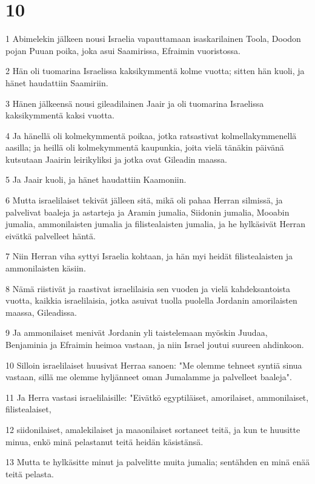 \chapter{10}

\par 1 Abimelekin jälkeen nousi Israelia vapauttamaan isaskarilainen Toola, Doodon pojan Puuan poika, joka asui Saamirissa, Efraimin vuoristossa.
\par 2 Hän oli tuomarina Israelissa kaksikymmentä kolme vuotta; sitten hän kuoli, ja hänet haudattiin Saamiriin.
\par 3 Hänen jälkeensä nousi gileadilainen Jaair ja oli tuomarina Israelissa kaksikymmentä kaksi vuotta.
\par 4 Ja hänellä oli kolmekymmentä poikaa, jotka ratsastivat kolmellakymmenellä aasilla; ja heillä oli kolmekymmentä kaupunkia, joita vielä tänäkin päivänä kutsutaan Jaairin leirikyliksi ja jotka ovat Gileadin maassa.
\par 5 Ja Jaair kuoli, ja hänet haudattiin Kaamoniin.
\par 6 Mutta israelilaiset tekivät jälleen sitä, mikä oli pahaa Herran silmissä, ja palvelivat baaleja ja astarteja ja Aramin jumalia, Siidonin jumalia, Mooabin jumalia, ammonilaisten jumalia ja filistealaisten jumalia, ja he hylkäsivät Herran eivätkä palvelleet häntä.
\par 7 Niin Herran viha syttyi Israelia kohtaan, ja hän myi heidät filistealaisten ja ammonilaisten käsiin.
\par 8 Nämä riistivät ja raastivat israelilaisia sen vuoden ja vielä kahdeksantoista vuotta, kaikkia israelilaisia, jotka asuivat tuolla puolella Jordanin amorilaisten maassa, Gileadissa.
\par 9 Ja ammonilaiset menivät Jordanin yli taistelemaan myöskin Juudaa, Benjaminia ja Efraimin heimoa vastaan, ja niin Israel joutui suureen ahdinkoon.
\par 10 Silloin israelilaiset huusivat Herraa sanoen: "Me olemme tehneet syntiä sinua vastaan, sillä me olemme hyljänneet oman Jumalamme ja palvelleet baaleja".
\par 11 Ja Herra vastasi israelilaisille: "Eivätkö egyptiläiset, amorilaiset, ammonilaiset, filistealaiset,
\par 12 siidonilaiset, amalekilaiset ja maaonilaiset sortaneet teitä, ja kun te huusitte minua, enkö minä pelastanut teitä heidän käsistänsä.
\par 13 Mutta te hylkäsitte minut ja palvelitte muita jumalia; sentähden en minä enää teitä pelasta.
